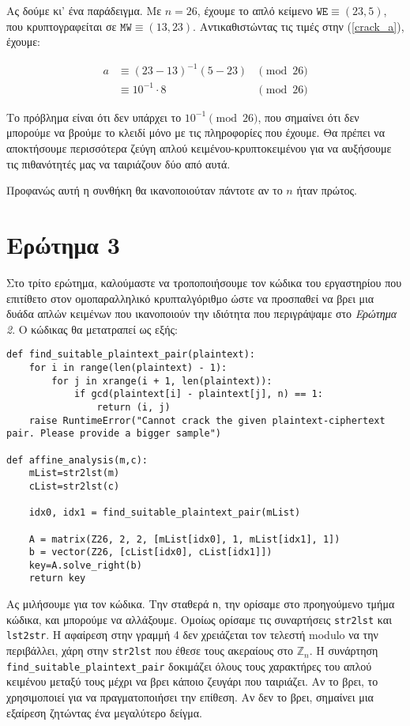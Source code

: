 \documentclass{article}
\begin{document}
Ας δούμε κι' ένα παράδειγμα. Με $n = 26$, έχουμε το απλό κείμενο $\texttt{WE} \equiv (23, 5)$, που κρυπτογραφείται σε $\texttt{MW} \equiv (13, 23)$. Αντικαθιστώντας τις τιμές στην (\ref{crack_a}), έχουμε:

\begin{align*}
a &\equiv (23 - 13)^{-1} (5 - 23) &\pmod{26} \\
  &\equiv 10^{-1} \cdot 8 &\pmod{26}
\end{align*}

Το πρόβλημα είναι ότι δεν υπάρχει το $10^{-1} \pmod{26}$, που σημαίνει ότι δεν μπορούμε να βρούμε το κλειδί μόνο με τις πληροφορίες που έχουμε. Θα πρέπει να αποκτήσουμε περισσότερα ζεύγη απλού κειμένου-κρυπτοκειμένου για να αυξήσουμε τις πιθανότητές μας να ταιριάζουν δύο από αυτά.

Προφανώς αυτή η συνθήκη θα ικανοποιούταν πάντοτε αν το $n$ ήταν πρώτος.

\section*{Ερώτημα 3}

Στο τρίτο ερώτημα, καλούμαστε να τροποποιήσουμε τον κώδικα του εργαστηρίου που επιτίθετο στον ομοπαραλληλικό κρυπταλγόριθμο ώστε να προσπαθεί να βρει μια δυάδα απλών κειμένων που ικανοποιούν την ιδιότητα που περιγράψαμε στο \emph{Ερώτημα 2}. Ο κώδικας θα μετατραπεί ως εξής:

\begin{lstlisting}
def find_suitable_plaintext_pair(plaintext):
    for i in range(len(plaintext) - 1):
        for j in xrange(i + 1, len(plaintext)):
            if gcd(plaintext[i] - plaintext[j], n) == 1:
                return (i, j)
    raise RuntimeError("Cannot crack the given plaintext-ciphertext pair. Please provide a bigger sample")

def affine_analysis(m,c):
    mList=str2lst(m)
    cList=str2lst(c)

    idx0, idx1 = find_suitable_plaintext_pair(mList)

    A = matrix(Z26, 2, 2, [mList[idx0], 1, mList[idx1], 1])
    b = vector(Z26, [cList[idx0], cList[idx1]])
    key=A.solve_right(b)
    return key
\end{lstlisting}

Ας μιλήσουμε για τον κώδικα. Την σταθερά \lstinline|n|, την ορίσαμε στο προηγούμενο τμήμα κώδικα, και μπορούμε να αλλάξουμε. Ομοίως ορίσαμε τις συναρτήσεις \lstinline|str2lst| και \lstinline|lst2str|. Η αφαίρεση στην γραμμή 4 δεν χρειάζεται τον τελεστή modulo να την περιβάλλει, χάρη στην \lstinline|str2lst| που έθεσε τους ακεραίους στο $\mathbb{Z}_n$. Η συνάρτηση \lstinline|find_suitable_plaintext_pair| δοκιμάζει όλους τους χαρακτήρες του απλού κειμένου μεταξύ τους μέχρι να βρει κάποιο ζευγάρι που ταιριάζει. Αν το βρει, το χρησιμοποιεί για να πραγματοποιήσει την επίθεση. Αν δεν το βρει, σημαίνει μια εξαίρεση ζητώντας ένα μεγαλύτερο δείγμα.
\end{document}
